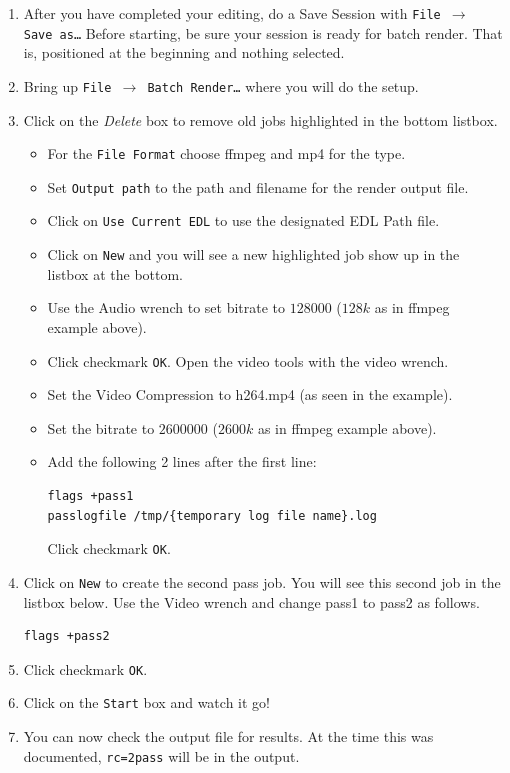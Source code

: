 \begin{enumerate}
    \item After you have completed your editing, do a Save Session with \texttt{File $\rightarrow$ Save as\dots}
    Before starting, be sure your session is ready for batch render. That is, positioned at the beginning and nothing selected.
    \item Bring up \texttt{File $\rightarrow$ Batch Render\dots} where you will do the setup.
    \item Click on the \textit{Delete} box  to remove old jobs highlighted in the bottom listbox.
    \begin{itemize}
        \item For the \texttt{File Format} choose ffmpeg and mp4 for the type.
        \item Set \texttt{Output path} to the path and filename for the render output file.
        \item Click on \texttt{Use Current EDL} to use the designated EDL Path file.
        \item Click on \texttt{New} and you will see a new highlighted job show up in the listbox at the bottom.
        \item Use the Audio wrench to set bitrate to $128000$ ($128k$ as in ffmpeg example above).
        \item Click checkmark \texttt{OK}.  Open the video tools with the video wrench.
        \item Set the Video Compression to h264.mp4 (as seen in the example).
        \item Set the bitrate to $2600000$ ($2600k$ as in ffmpeg example above).
        \item Add the following 2 lines after the first line:
        \begin{lstlisting}[language=bash]
flags +pass1
passlogfile /tmp/{temporary log file name}.log
        \end{lstlisting}
        Click checkmark \texttt{OK}.
    \end{itemize}    
    \item Click on \texttt{New} to create the second pass job.  You will see this second job in the listbox below.
     Use the Video wrench and change pass1 to pass2 as follows.
        \begin{lstlisting}[language=bash]
flags +pass2
        \end{lstlisting}
    \item Click checkmark \texttt{OK}.
    \item Click on the \texttt{Start} box and watch it go!
    \item You can now check the output file for results.  At the time this was documented, \texttt{rc=2pass} will be
        in the output.    
\end{enumerate}


